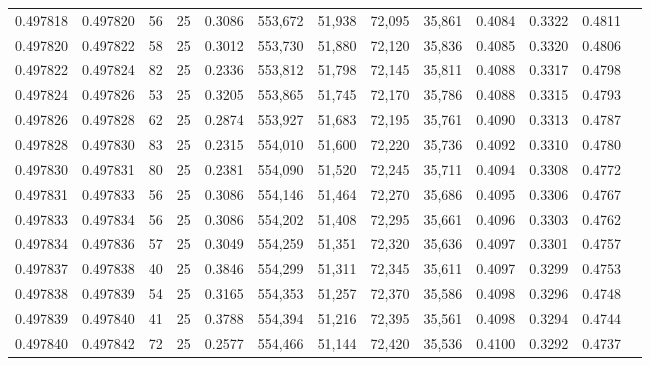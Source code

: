 \begin{tabular}{rrrrrrrrrrrrr}
0.497818 & 0.497820 &    56 &  25 &                                     0.3086 & 553,672 &  51,938 &  72,095 &  35,861 & 0.4084 & 0.3322 & 0.4811 \\
0.497820 & 0.497822 &    58 &  25 &                                     0.3012 & 553,730 &  51,880 &  72,120 &  35,836 & 0.4085 & 0.3320 & 0.4806 \\
0.497822 & 0.497824 &    82 &  25 &                                     0.2336 & 553,812 &  51,798 &  72,145 &  35,811 & 0.4088 & 0.3317 & 0.4798 \\
0.497824 & 0.497826 &    53 &  25 &                                     0.3205 & 553,865 &  51,745 &  72,170 &  35,786 & 0.4088 & 0.3315 & 0.4793 \\
0.497826 & 0.497828 &    62 &  25 &                                     0.2874 & 553,927 &  51,683 &  72,195 &  35,761 & 0.4090 & 0.3313 & 0.4787 \\
0.497828 & 0.497830 &    83 &  25 &                                     0.2315 & 554,010 &  51,600 &  72,220 &  35,736 & 0.4092 & 0.3310 & 0.4780 \\
0.497830 & 0.497831 &    80 &  25 &                                     0.2381 & 554,090 &  51,520 &  72,245 &  35,711 & 0.4094 & 0.3308 & 0.4772 \\
0.497831 & 0.497833 &    56 &  25 &                                     0.3086 & 554,146 &  51,464 &  72,270 &  35,686 & 0.4095 & 0.3306 & 0.4767 \\
0.497833 & 0.497834 &    56 &  25 &                                     0.3086 & 554,202 &  51,408 &  72,295 &  35,661 & 0.4096 & 0.3303 & 0.4762 \\
0.497834 & 0.497836 &    57 &  25 &                                     0.3049 & 554,259 &  51,351 &  72,320 &  35,636 & 0.4097 & 0.3301 & 0.4757 \\
0.497837 & 0.497838 &    40 &  25 &                                     0.3846 & 554,299 &  51,311 &  72,345 &  35,611 & 0.4097 & 0.3299 & 0.4753 \\
0.497838 & 0.497839 &    54 &  25 &                                     0.3165 & 554,353 &  51,257 &  72,370 &  35,586 & 0.4098 & 0.3296 & 0.4748 \\
0.497839 & 0.497840 &    41 &  25 &                                     0.3788 & 554,394 &  51,216 &  72,395 &  35,561 & 0.4098 & 0.3294 & 0.4744 \\
0.497840 & 0.497842 &    72 &  25 &                                     0.2577 & 554,466 &  51,144 &  72,420 &  35,536 & 0.4100 & 0.3292 & 0.4737 \\

\end{tabular}
